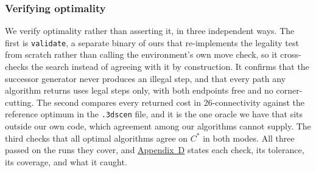 \documentclass[letterpaper]{article} %
\begin{document}
\subsubsection{Verifying optimality}
We verify optimality rather than asserting it, in three independent ways. The first is \texttt{validate}, a separate binary of ours that re-implements the legality test from scratch rather than calling the environment's own move check, so it cross-checks the search instead of agreeing with it by construction. It confirms that the successor generator never produces an illegal step, and that every path any algorithm returns uses legal steps only, with both endpoints free and no corner-cutting. The second compares every returned cost in 26-connectivity against the reference optimum in the \texttt{.3dscen} file, and it is the one oracle we have that sits outside our own code, which agreement among our algorithms cannot supply. The third checks that all optimal algorithms agree on $C^*$ in both modes. All three passed on the runs they cover, and \hyperref[app:d]{Appendix~D} states each check, its tolerance, its coverage, and what it caught.
\end{document}
